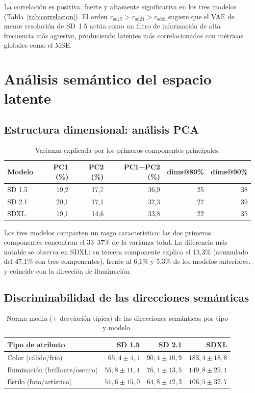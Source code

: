 \documentclass[12pt, a4paper, twoside]{book}
\begin{document}
La correlación es positiva, fuerte y altamente significativa en los tres modelos (Tabla~\ref{tab:correlacion}). El orden $r_{\text{sd15}} > r_{\text{sd21}} > r_{\text{sdxl}}$ sugiere que el VAE de menor resolución de SD~1.5 actúa como un filtro de información de alta frecuencia más agresivo, produciendo latentes más correlacionados con métricas globales como el MSE.

\section{Análisis semántico del espacio latente}
\label{sec:res:semantico}

\subsection{Estructura dimensional: análisis PCA}

\begin{table}[htb]
\centering
\caption{Varianza explicada por los primeros componentes principales.}
\label{tab:pca}
\small
\begin{tabular}{lrrrrr}
\toprule
\textbf{Modelo} & \textbf{PC1 (\%)} & \textbf{PC2 (\%)} & \textbf{PC1+PC2 (\%)} & \textbf{dims@80\%} & \textbf{dims@90\%} \\
\midrule
SD 1.5 & 19,2 & 17,7 & 36,9 & 25 & 38 \\
SD 2.1 & 20,1 & 17,1 & 37,3 & 27 & 39 \\
SDXL   & 19,1 & 14,6 & 33,8 & 22 & 35 \\
\bottomrule
\end{tabular}
\end{table}

Los tres modelos comparten un rasgo característico: las dos primeras componentes concentran el 33--37\% de la varianza total. La diferencia más notable se observa en SDXL: su tercera componente explica el 13,3\% (acumulado del 47,1\% con tres componentes), frente al 6,1\% y 5,3\% de los modelos anteriores, y coincide con la dirección de iluminación.

\subsection{Discriminabilidad de las direcciones semánticas}

\begin{table}[htb]
\centering
\caption{Norma media ($\pm$ desviación típica) de las direcciones semánticas por tipo y modelo.}
\label{tab:normas_dir}
\small
\begin{tabular}{lrrr}
\toprule
\textbf{Tipo de atributo} & \textbf{SD 1.5} & \textbf{SD 2.1} & \textbf{SDXL} \\
\midrule
Color (cálido/frío)        & $65{,}4 \pm 4{,}1$  & $90{,}4 \pm 10{,}9$ & $183{,}4 \pm 18{,}8$ \\
Iluminación (brillante/oscuro) & $55{,}8 \pm 11{,}4$ & $76{,}1 \pm 13{,}5$ & $149{,}8 \pm 29{,}1$ \\
Estilo (foto/artístico)    & $51{,}6 \pm 15{,}0$ & $64{,}8 \pm 12{,}3$ & $106{,}5 \pm 32{,}7$ \\
\bottomrule
\end{tabular}
\end{table}
\end{document}
